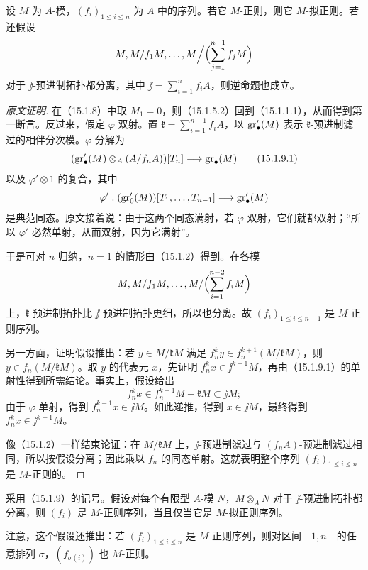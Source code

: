 设 $M$ 为 $A$-模，$(f_i)_{1\leq i\leq n}$ 为 $A$ 中的序列。若它 $M$-正则，则它 $M$-拟正则。若还假设
\[
 M,\quad M/f_1M,\quad\ldots,\quad
 M\Big/\Bigl(\sum_{j=1}^{n-1}f_jM\Bigr)
\]
对于 $\jj$-预进制拓扑都分离，其中 $\jj=\sum_{i=1}^n f_iA$，则逆命题也成立。
\begin{proof}[原文证明]
在（15.1.8）中取 $M_1=0$，则（15.1.5.2）回到（15.1.1.1），从而得到第一断言。反过来，假定 $\varphi$ 双射。置 $\mathfrak k=\sum_{i=1}^{n-1}f_iA$，以 $\gr'_\bullet(M)$ 表示 $\mathfrak k$-预进制滤过的相伴分次模。$\varphi$ 分解为
\begin{equation}
 (\gr'_\bullet(M)\otimes_A(A/f_nA))[T_n]
 \longrightarrow\gr_\bullet(M)
 \tag{15.1.9.1}
\end{equation}
以及 $\varphi'\otimes1$ 的复合，其中
\[
 \varphi':(\gr'_0(M))[T_1,\ldots,T_{n-1}]
       \longrightarrow\gr'_\bullet(M)
\]
是典范同态。原文接着说：由于这两个同态满射，若 $\varphi$ 双射，它们就都双射；“所以 $\varphi'$ 必然单射，从而双射，因为它满射”。

于是可对 $n$ 归纳，$n=1$ 的情形由（15.1.2）得到。在各模
\[
 M,\quad M/f_1M,\quad\ldots,\quad M/\Bigl(\sum_{i=1}^{n-2}f_iM\Bigr)
\]
上，$\mathfrak k$-预进制拓扑比 $\jj$-预进制拓扑更细，所以也分离。故 $(f_i)_{1\leq i\leq n-1}$ 是 $M$-正则序列。

另一方面，证明假设推出：若 $y\in M/\mathfrak kM$ 满足
$f_n^k y\in f_n^{k+1}(M/\mathfrak kM)$，则 $y\in f_n(M/\mathfrak kM)$。取 $y$ 的代表元 $x$，先证明 $f_n^k x\in\jj^{k+1}M$，再由（15.1.9.1）的单射性得到所需结论。事实上，假设给出
\[
 f_n^k x\in f_n^{k+1}M+\mathfrak kM\subset\jj M;
\]
由于 $\varphi$ 单射，得到 $f_n^{k-1}x\in\jj M$。如此递推，得到 $x\in\jj M$，最终得到 $f_n^kx\in\jj^{k+1}M$。

像（15.1.2）一样结束论证：在 $M/\mathfrak kM$ 上，$\jj$-预进制滤过与 $(f_nA)$-预进制滤过相同，所以按假设分离；因此乘以 $f_n$ 的同态单射。这就表明整个序列 $(f_i)_{1\leq i\leq n}$ 是 $M$-正则的。
\end{proof}

采用（15.1.9）的记号。假设对每个有限型 $A$-模 $N$，$M\otimes_A N$ 对于 $\jj$-预进制拓扑都分离，则 $(f_i)$ 是 $M$-正则序列，当且仅当它是 $M$-拟正则序列。

注意，这个假设还推出：若 $(f_i)_{1\leq i\leq n}$ 是 $M$-正则序列，则对区间 $[1,n]$ 的任意排列 $\sigma$，$(f_{\sigma(i)})$ 也 $M$-正则。

